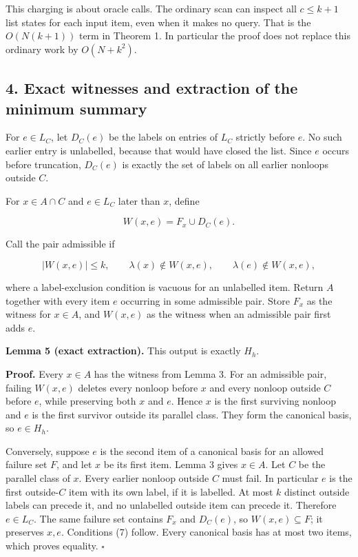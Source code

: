 This charging is about oracle calls. The ordinary scan can inspect all \(c\le k+1\) list states for each input item, even when it makes no query. That is the \(O(N(k+1))\) term in Theorem 1. In particular the proof does not replace this ordinary work by \(O(N+k^2)\).

\hypertarget{af-b41875cb6e-exact-witnesses-and-extraction-of-the-minimum-summary}{%
\subsection{4. Exact witnesses and extraction of the minimum summary}\label{af-b41875cb6e-exact-witnesses-and-extraction-of-the-minimum-summary}}

For \(e\in L_C\), let \(D_C(e)\) be the labels on entries of \(L_C\) strictly before \(e\). No such earlier entry is unlabelled, because that would have closed the list. Since \(e\) occurs before truncation, \(D_C(e)\) is exactly the set of labels on all earlier nonloops outside \(C\).

For \(x\in A\cap C\) and \(e\in L_C\) later than \(x\), define

\[
W(x,e)=F_x\cup D_C(e).
\tag{6}
\]

Call the pair admissible if

\[
|W(x,e)|\le k,\qquad
\lambda(x)\notin W(x,e),\qquad
\lambda(e)\notin W(x,e),
\tag{7}
\]

where a label-exclusion condition is vacuous for an unlabelled item. Return \(A\) together with every item \(e\) occurring in some admissible pair. Store \(F_x\) as the witness for \(x\in A\), and \(W(x,e)\) as the witness when an admissible pair first adds \(e\).

\textbf{Lemma 5 (exact extraction).} This output is exactly \(H_h\).

\textbf{Proof.} Every \(x\in A\) has the witness from Lemma 3. For an admissible pair, failing \(W(x,e)\) deletes every nonloop before \(x\) and every nonloop outside \(C\) before \(e\), while preserving both \(x\) and \(e\). Hence \(x\) is the first surviving nonloop and \(e\) is the first survivor outside its parallel class. They form the canonical basis, so \(e\in H_h\).

Conversely, suppose \(e\) is the second item of a canonical basis for an allowed failure set \(F\), and let \(x\) be its first item. Lemma 3 gives \(x\in A\). Let \(C\) be the parallel class of \(x\). Every earlier nonloop outside \(C\) must fail. In particular \(e\) is the first outside-\(C\) item with its own label, if it is labelled. At most \(k\) distinct outside labels can precede it, and no unlabelled outside item can precede it. Therefore \(e\in L_C\). The same failure set contains \(F_x\) and \(D_C(e)\), so \(W(x,e)\subseteq F\); it preserves \(x,e\). Conditions (7) follow. Every canonical basis has at most two items, which proves equality. \(\square\)

